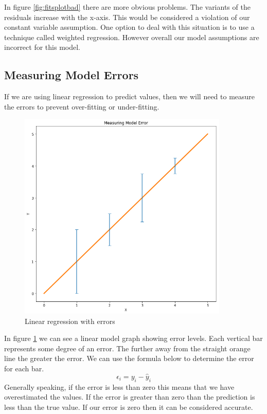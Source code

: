 In figure \ref{fig:fitsplotbad} \cite{heteroscedasticity} there are more obvious problems. The variants of the residuals increase with the x-axis. This would be considered a violation of our constant variable assumption. One option to deal with this situation is to use a technique called weighted regression. However overall our model assumptions are incorrect for this model.

\subsection{Measuring Model Errors}

If we are using linear regression to predict values, then we will need to measure the errors to prevent over-fitting or under-fitting.
\begin{figure}[H]
  \centering
  \includegraphics[scale=0.5,width=100mm]{./images/graph-error-bars.png}
  \caption{Linear regression with errors}
  \label{fig:graph-error-bars}
\end{figure}
In figure \ref{fig:graph-error-bars} we can see a linear model graph showing error levels. Each vertical bar represents some degree of an error. The further away from the straight orange line the greater the error. We can use the formula below to determine the error for each bar.
\begin{equation}
    \epsilon_i = y_i - \hat y_i
\end{equation}
Generally speaking, if the error is less than zero this means that we have overestimated the values. If the error is greater than zero than the prediction is less than the true value. If our error is zero then it can be considered accurate.

